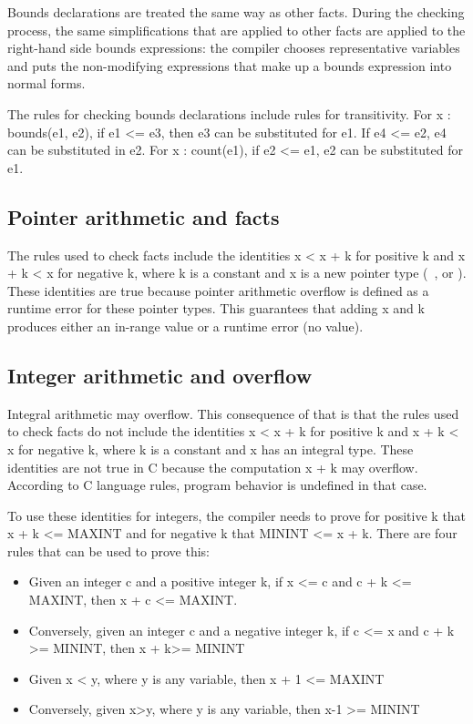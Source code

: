 Bounds declarations are treated the same way as other facts. During the
checking process, the same simplifications that are applied to other
facts are applied to the right-hand side bounds expressions: the
compiler chooses representative variables and puts the non-modifying
expressions that make up a bounds expression into normal forms.

The rules for checking bounds declarations include rules for
transitivity. For x : bounds(e1, e2), if e1 \textless{}= e3, then e3 can
be substituted for e1. If e4 \textless{}= e2, e4 can be substituted in
e2. For x : count(e1), if e2 \textless{}= e1, e2 can be substituted for
e1.

\subsection{Pointer arithmetic and facts}

The rules used to check facts include the identities x \textless{} x + k
for positive k and x + k \textless{} x for negative k, where k is a
constant and x is a new pointer type (\ptr\,
\arrayview, or \arrayptr). These identities are true
because pointer arithmetic overflow is defined as a runtime error for
these pointer types. This guarantees that adding x and k produces either
an in-range value or a runtime error (no value).

\subsection{Integer arithmetic and overflow}

Integral arithmetic may overflow. This consequence of that is that the
rules used to check facts do not include the identities x \textless{} x
+ k for positive k and x + k \textless{} x for negative k, where k is a
constant and x has an integral type. These identities are not true in C
because the computation x + k may overflow. According to C language
rules, program behavior is undefined in that case.

To use these identities for integers, the compiler needs to prove for
positive k that x + k \textless{}= MAXINT and for negative k that MININT
\textless{}= x + k. There are four rules that can be used to prove this:

\begin{itemize}
\item
  Given an integer c and a positive integer k, if x \textless{}= c and c
  + k \textless{}= MAXINT, then x + c \textless{}= MAXINT.
\item
  Conversely, given an integer c and a negative integer k, if c
  \textless{}= x and c + k \textgreater{}= MININT, then x +
  k\textgreater{}= MININT
\item
  Given x \textless{} y, where y is any variable, then x + 1
  \textless{}= MAXINT
\item
  Conversely, given x\textgreater{}y, where y is any variable, then x-1
  \textgreater{}= MININT
\end{itemize}

